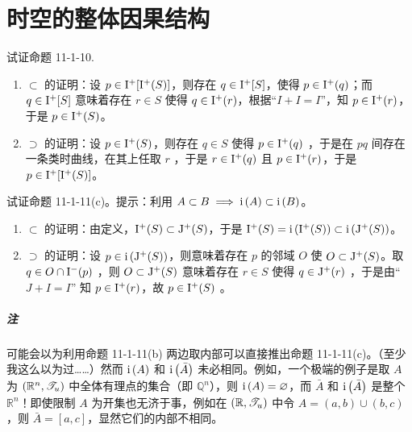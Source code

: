 
\chapter{时空的整体因果结构}

\begin{xiti}
    \item 试证命题 11-1-10.

    \begin{zm}
        \begin{enumerate}
            \item $\subset$ 的证明：设 $p \in \mathrm{I}^+[\mathrm{I}^+(S)]$，则存在 $q \in \mathrm{I}^+[S] $，使得 $p \in \mathrm{I}^+(q)$；而 $q \in \mathrm{I}^+ [S]$ 意味着存在 $r \in S$ 使得 $q \in \mathrm{I}^+ (r)$，根据“$I+I=I$”，知 $p \in \mathrm{I}^+(r)$，于是 $p \in \mathrm{I}^+(S)$。
            \item $\supset$ 的证明：设 $p \in \mathrm{I}^+(S)$，则存在 $q \in S$ 使得 $p \in \mathrm{I}^+(q)$ ，于是在 $pq$ 间存在一条类时曲线，在其上任取 $r$ ，于是 $r \in \mathrm{I}^+(q)$ 且 $p \in \mathrm{I}^+(r)$，于是 $p \in \mathrm{I}^+[\mathrm{I}^+(S)]$。
        \end{enumerate}
    \end{zm}

    \item 试证命题 11-1-11(c)。提示：利用 $A \subset B \implies \mathrm{i}\left( A \right) \subset \mathrm{i}\left( B \right)$。

    \begin{zm}
        \begin{enumerate}
            \item $\subset$ 的证明：由定义，$\mathrm{I}^+(S) \subset \mathrm{J}^+ (S)$，于是 $\mathrm{I}^+(S) = \mathrm{i}\left( \mathrm{I}^+ (S) \right) \subset \mathrm{i}\left( \mathrm{J}^+(S) \right)$。
            \item $\supset$ 的证明：设 $p \in \mathrm{i}\left( \mathrm{J}^+(S) \right)$，则意味着存在 $p$ 的邻域 $O$ 使 $O \subset \mathrm{J}^+(S)$。取 $q \in O \cap \mathrm{I}^-(p)$ ，则 $O \subset \mathrm{J}^+(S)$ 意味着存在 $r \in S$ 使得 $q\in \mathrm{J}^+(r)$ ，于是由“$J + I = I$” 知 $p \in \mathrm{I}^+(r)$，故 $p \in \mathrm{I}^+(S)$ 。
        \end{enumerate}

        \paragraph{注} 可能会以为利用命题 11-1-11(b) 两边取内部可以直接推出命题 11-1-11(c)。（至少我这么以为过……）然而 $\mathrm{i}\left( A \right)$ 和 $\mathrm{i}\left( \bar{A} \right)$ 未必相同。例如，一个极端的例子是取 $A$ 为 $\left(\mathbb{R}^n,\mathscr{T}_u\right)$ 中全体有理点的集合（即 $\mathbb{Q}^n$），则 $\mathrm{i}\left( A \right)= \varnothing$，而 $\bar{A}$ 和 $\mathrm{i}\left( \bar{A} \right)$ 是整个 $\mathbb{R}^n$！即使限制 $A$ 为开集也无济于事，例如在 $(\mathbb{R},\mathscr{T}_u)$ 中令 $A = (a,b) \cup (b,c)$，则 $\bar{A} = [a,c]$，显然它们的内部不相同。
    \end{zm}


\end{xiti}
